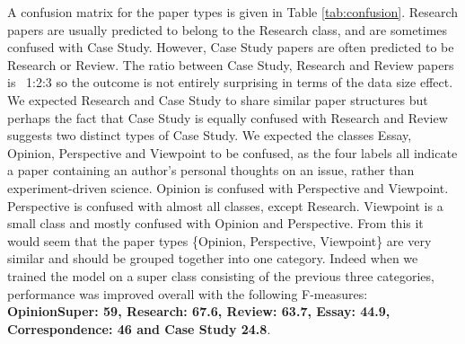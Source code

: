 \documentclass{svmult}
\begin{document}
A confusion matrix for the paper types is given in Table
\ref{tab:confusion}. Research papers are usually predicted to belong
to the Research class, and are sometimes confused with Case
Study. However, Case Study papers are often predicted to be Research
or Review. The ratio between Case Study, Research and Review papers is
~1:2:3 so the outcome is not entirely surprising in terms of the data
size effect. We expected Research and Case Study to share similar
paper structures but perhaps the fact that Case Study is equally
confused with Research and Review suggests two distinct types of Case
Study.  We expected the classes Essay, Opinion, Perspective and
Viewpoint to be confused, as the four labels all indicate a paper
containing an author's personal thoughts on an issue, rather than
experiment-driven science. Opinion is confused with Perspective and
Viewpoint. Perspective is confused with almost all classes, except
Research. Viewpoint is a small class and mostly confused with Opinion
and Perspective. From this it would seem that the paper types
\{Opinion, Perspective, Viewpoint\} are very similar and should be
grouped together into one category. Indeed when we trained the model
on a super class consisting of the previous three categories,
performance was improved overall with the following F-measures:
{\bf OpinionSuper: 59, Research: 67.6, Review: 63.7, Essay: 44.9,
Correspondence: 46 and Case Study 24.8}.
\end{document}
